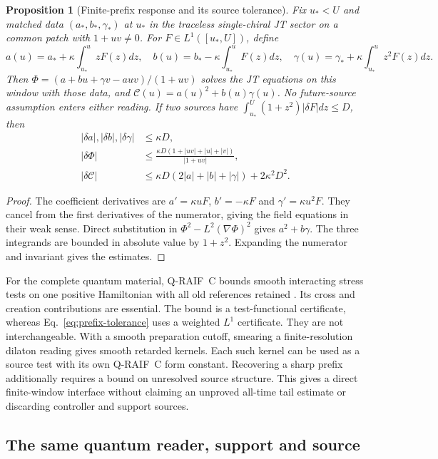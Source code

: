 \documentclass[12pt,a4paper]{article}
\newtheorem{proposition}[theorem]{Proposition}
\begin{document}
\begin{proposition}[Finite-prefix response and its source tolerance]
\label{prop:finite-prefix-response}
Fix $u_*<U$ and matched data $(a_*,b_*,\gamma_*)$ at $u_*$ in the
traceless single-chiral JT sector on a common patch with $1+uv\ne0$.
For $F\in L^1([u_*,U])$, define
\[
 a(u)=a_*+\kappa\int_{u_*}^{u}zF(z)dz,\quad
 b(u)=b_*-\kappa\int_{u_*}^{u}F(z)dz,\quad
 \gamma(u)=\gamma_*+\kappa\int_{u_*}^{u}z^2F(z)dz.
\]
Then $\Phi=(a+bu+\gamma v-auv)/(1+uv)$ solves the JT equations
on this window with those data, and
$\mathcal C(u)=a(u)^2+b(u)\gamma(u)$. No future-source assumption
enters either reading. If two sources have
$\int_{u_*}^{U}(1+z^2)|\delta F|dz\le D$, then
\begin{align}
 |\delta a|,|\delta b|,|\delta\gamma|&\le\kappa D,\nonumber\\
 |\delta\Phi|&\le
 \frac{\kappa D(1+|uv|+|u|+|v|)}{|1+uv|},\label{eq:prefix-tolerance}\\
 |\delta\mathcal C|&\le
 \kappa D(2|a|+|b|+|\gamma|)+2\kappa^2D^2.\nonumber
\end{align}
\end{proposition}
\begin{proof}
The coefficient derivatives are $a'=\kappa uF$, $b'=-\kappa F$
and $\gamma'=\kappa u^2F$. They cancel from the first derivatives
of the numerator, giving the field equations in their weak sense.
Direct substitution in $\Phi^2-L^2(\nabla\Phi)^2$ gives
$a^2+b\gamma$. The three integrands are bounded in absolute value
by $1+z^2$. Expanding the numerator and invariant gives the estimates.
\end{proof}

For the complete quantum material, Q-RAIF~C bounds smooth interacting
stress tests on one positive Hamiltonian with all old references retained
\cite{QRC}. Its cross and creation contributions are essential.
The bound is a test-functional certificate, whereas
Eq.~\eqref{eq:prefix-tolerance} uses a weighted $L^1$ certificate.
They are not interchangeable. With a smooth preparation cutoff,
smearing a finite-resolution dilaton reading gives smooth retarded kernels.
Each such kernel can be used as a source test with its own Q-RAIF~C
form constant. Recovering a sharp prefix additionally requires a bound
on unresolved source structure. This gives a direct finite-window
interface without claiming an unproved all-time tail estimate or
discarding controller and support sources.

\subsection{The same quantum reader, support and source}
\end{document}
